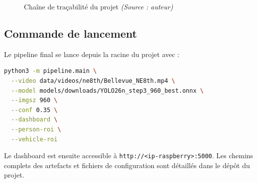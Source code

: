 \begin{figure}[H]
{}
\caption{Chaîne de traçabilité du projet
         \textit{(Source : auteur)}}
\label{fig:mlops_pipeline}
\end{figure}

\subsection{Commande de lancement}

Le pipeline final se lance depuis la
racine du projet avec :

\begin{lstlisting}[language=bash,
caption={Lancement du pipeline final}]
python3 -m pipeline.main \
  --video data/videos/ne8th/Bellevue_NE8th.mp4 \
  --model models/downloads/YOLO26n_step3_960_best.onnx \
  --imgsz 960 \
  --conf 0.35 \
  --dashboard \
  --person-roi \
  --vehicle-roi
\end{lstlisting}

Le dashboard est ensuite accessible à
\texttt{http://<ip-raspberry>:5000}.
Les chemins complets des artefacts et
fichiers de configuration sont détaillés
dans le dépôt du projet.